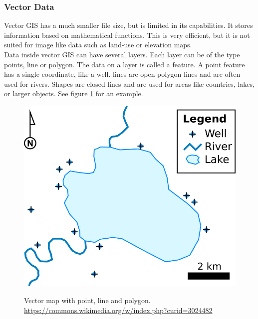 \subsubsection{Vector Data}
Vector GIS has a much smaller file size, but is limited in its capabilities. It stores information based on mathematical functions. This is very efficient, but it is not suited for image like data such as land-use or elevation maps.\\
Data inside vector GIS can have several layers. Each layer can be of the type points, line or polygon. The data on a layer is called a feature. A point feature has a single coordinate, like a well. lines are open polygon lines and are often used for rivers. Shapes are closed lines and are used for areas like countries, lakes, or larger objects. See figure \ref{img:vector} for an example. \\
\begin{figure}[H]
	\centering
	\includegraphics[width=0.4\columnwidth]{res/vector-map}\\
	\caption[]{Vector map with point, line and polygon. \url{https://commons.wikimedia.org/w/index.php?curid=3024482}}
	\label{img:vector}
\end{figure}



%
%
%
